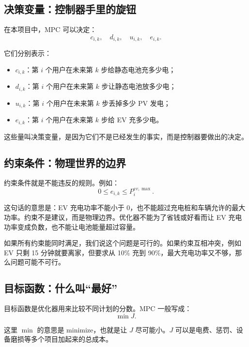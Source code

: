 \documentclass[UTF8,zihao=-4]{ctexart}
\begin{document}
\subsection{决策变量：控制器手里的旋钮}

在本项目中，MPC 可以决定：
\begin{equation}
c_{i,k},\quad d_{i,k},\quad u_{i,k},\quad e_{i,k}.
\end{equation}

它们分别表示：
\begin{itemize}
  \item $c_{i,k}$：第 $i$ 个用户在未来第 $k$ 步给静态电池充多少电；
  \item $d_{i,k}$：第 $i$ 个用户在未来第 $k$ 步让静态电池放多少电；
  \item $u_{i,k}$：第 $i$ 个用户在未来第 $k$ 步丢掉多少 PV 发电；
  \item $e_{i,k}$：第 $i$ 个用户在未来第 $k$ 步给 EV 充多少电。
\end{itemize}

这些量叫决策变量，是因为它们不是已经发生的事实，而是控制器要做出的决定。

\subsection{约束条件：物理世界的边界}

约束条件就是不能违反的规则。例如：
\begin{equation}
0\le e_{i,k}\le P^{ev,\max}_i.
\end{equation}

这句话的意思是：EV 充电功率不能小于 0，也不能超过充电桩和车辆允许的最大功率。约束不是建议，而是物理边界。优化器不能为了省钱或好看而让 EV 充电功率变成负数，也不能让电池能量超过容量。

如果所有约束能同时满足，我们说这个问题是可行的。如果约束互相冲突，例如 EV 只剩 15 分钟就要离家，但要求从 10\% 充到 90\%，最大充电功率又不够，那么问题可能不可行。

\subsection{目标函数：什么叫“最好”}

目标函数是优化器用来比较不同计划的分数。MPC 一般写成：
\begin{equation}
\min J.
\end{equation}

这里 $\min$ 的意思是 minimize，也就是让 $J$ 尽可能小。$J$ 可以是电费、惩罚、设备磨损等多个项目加起来的总成本。
\end{document}
